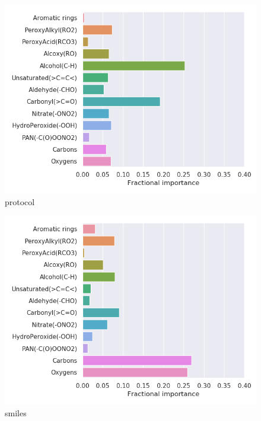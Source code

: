 \begin{subfigure}[b]{0.5\textwidth}
    \centering
    \includegraphics[width=\textwidth]{outputs/PCA/protocol/legend.png}
    \caption{protocol}
    \label{fig:legend_PCA_protocol}
\end{subfigure}
\begin{subfigure}[b]{0.5\textwidth}
    \centering
    \includegraphics[width=\textwidth]{outputs/PCA/smiles/legend.png}
    \caption{smiles}
    \label{fig:legend_PCA_smiles}
\end{subfigure}